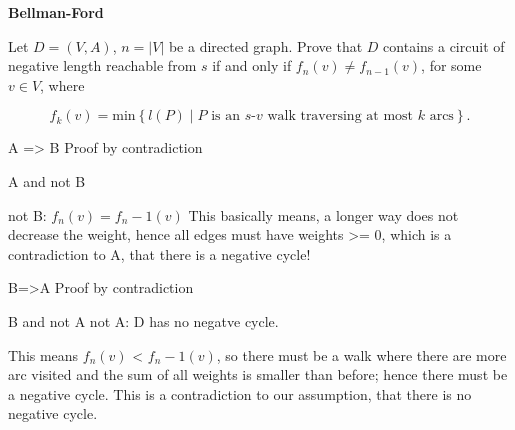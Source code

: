 \question \textbf{Bellman-Ford}

Let $D = (V, A)$, $n = \left|V \right|$ be a directed graph. Prove that $D$ contains a circuit of negative length reachable from $s$ if and only if $f_n(v) \neq f_{n−1}(v)$, for some $v \in V$, where 

$$f_k(v) = \text{min}\left\{l(P)\middle|P \text{ is an } s \text{-} v \text{ walk traversing at most } k \text{ arcs}\right\}.$$


\begin{solution}

A => B 
Proof by contradiction

A and not B 

not B: $f_n(v)=f_n-1(v)$ 
This basically means, a longer way does not decrease the weight, hence all edges must have weights >= 0, which is a contradiction to A, that there is a negative cycle!

B=>A 
Proof by contradiction 

B and not A 
not A: D has no negatve cycle.

This means $f_n(v)$ < $f_n-1(v)$, so there must be a walk where there are more arc visited and the sum of all weights is smaller than before; hence there must be a negative cycle.
This is a contradiction to our assumption, that there is no negative cycle. 


\end{solution}



